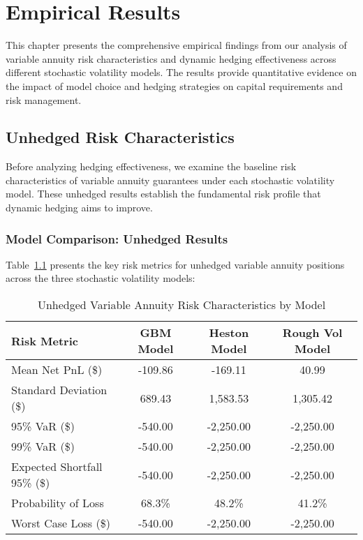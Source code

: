 \documentclass[12pt,a4paper]{report}
\begin{document}
\chapter{Empirical Results}

This chapter presents the comprehensive empirical findings from our analysis of variable annuity risk characteristics and dynamic hedging effectiveness across different stochastic volatility models. The results provide quantitative evidence on the impact of model choice and hedging strategies on capital requirements and risk management.

\section{Unhedged Risk Characteristics}

Before analyzing hedging effectiveness, we examine the baseline risk characteristics of variable annuity guarantees under each stochastic volatility model. These unhedged results establish the fundamental risk profile that dynamic hedging aims to improve.

\subsection{Model Comparison: Unhedged Results}

Table~\ref{tab:unhedged_results} presents the key risk metrics for unhedged variable annuity positions across the three stochastic volatility models:

\begin{table}[H]
\centering
\caption{Unhedged Variable Annuity Risk Characteristics by Model}
\label{tab:unhedged_results}
\begin{tabular}{lccc}
\toprule
\textbf{Risk Metric} & \textbf{GBM Model} & \textbf{Heston Model} & \textbf{Rough Vol Model} \\
\midrule
Mean Net PnL (\$) & -109.86 & -169.11 & 40.99 \\
Standard Deviation (\$) & 689.43 & 1,583.53 & 1,305.42 \\
95\% VaR (\$) & -540.00 & -2,250.00 & -2,250.00 \\
99\% VaR (\$) & -540.00 & -2,250.00 & -2,250.00 \\
Expected Shortfall 95\% (\$) & -540.00 & -2,250.00 & -2,250.00 \\
Probability of Loss & 68.3\% & 48.2\% & 41.2\% \\
Worst Case Loss (\$) & -540.00 & -2,250.00 & -2,250.00 \\
\bottomrule
\end{tabular}
\end{table}
\end{document}
